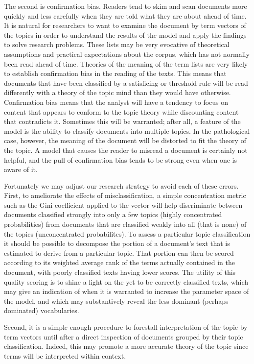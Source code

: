 \documentclass[]{book}
\theoremstyle{definition}
\theoremstyle{definition}
\theoremstyle{definition}
\theoremstyle{remark}
\begin{document}
The second is confirmation bias. Readers tend to skim and scan documents
more quickly and less carefully when they are told what they are about
ahead of time. It is natural for researchers to want to examine the
document by term vectors of the topics in order to understand the
results of the model and apply the findings to solve research problems.
These lists may be very evocative of theoretical assumptions and
practical expectations about the corpus, which has not normally been
read ahead of time. Theories of the meaning of the term lists are very
likely to establish confirmation bias in the reading of the texts. This
means that documents that have been classified by a satisficing or
threshold rule will be read differently with a theory of the topic mind
than they would have otherwise. Confirmation bias means that the analyst
will have a tendency to focus on content that appears to conform to the
topic theory while discounting content that contradicts it. Sometimes
this will be warranted; after all, a feature of the model is the ability
to classify documents into multiple topics. In the pathological case,
however, the meaning of the document will be distorted to fit the theory
of the topic. A model that causes the reader to misread a document is
certainly not helpful, and the pull of confirmation bias tends to be
strong even when one is aware of it.

Fortunately we may adjust our research strategy to avoid each of these
errors. First, to ameliorate the effects of misclassification, a simple
concentration metric such as the Gini coefficient applied to the vector
will help discriminate between documents classified strongly into only a
few topics (highly concentrated probabilities) from documents that are
classified weakly into all (that is none) of the topics (unconcentrated
probabilites). To assess a particular topic classification it should be
possible to decompose the portion of a document's text that is estimated
to derive from a particular topic. That portion can then be scored
according to its weighted average rank of the terms actually contained
in the document, with poorly classified texts having lower scores. The
utility of this quality scoring is to shine a light on the yet to be
correctly classified texts, which may give an indication of when it is
warranted to increase the parameter space of the model, and which may
substantively reveal the less dominant (perhaps dominated) vocabularies.

Second, it is a simple enough procedure to forestall interpretation of
the topic by term vectors until after a direct inspection of documents
grouped by their topic classification. Indeed, this may promote a more
accurate theory of the topic since terms will be interpreted within
context.
\end{document}
